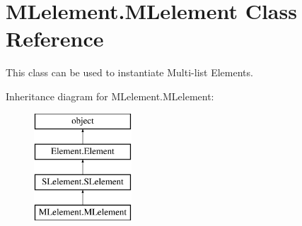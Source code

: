 \hypertarget{class_m_lelement_1_1_m_lelement}{}\section{M\+Lelement.\+M\+Lelement Class Reference}
\label{class_m_lelement_1_1_m_lelement}


This class can be used to instantiate Multi-\/list Elements.  


Inheritance diagram for M\+Lelement.\+M\+Lelement\+:\begin{figure}[H]
\begin{center}
\leavevmode
\includegraphics[height=4.000000cm]{class_m_lelement_1_1_m_lelement}
\end{center}
\end{figure}
